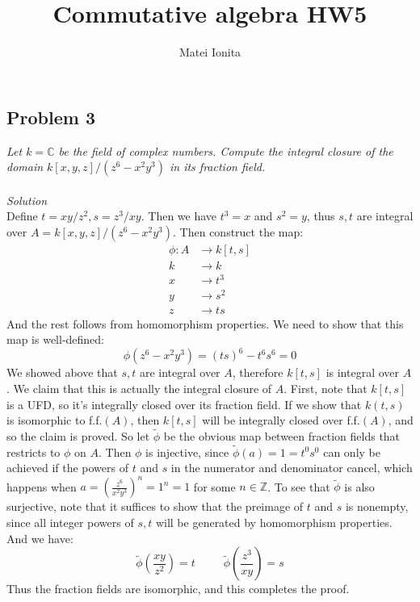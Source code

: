 \documentclass[12 pt]{article}
\title{Commutative algebra HW5}
\author{Matei Ionita}
\newcommand{\Z}{\mathbb{Z}}
\newcommand{\C}{\mathbb{C}}
\begin{document}
  \maketitle

\subsection*{Problem 3}
\emph{Let $k = \C$ be the field of complex numbers. Compute the integral closure of the domain $k[x, y, z]/(z^6 - x^2 y^3)$ in its fraction field.}
\\
\\
\emph{Solution}
\\
Define $t = xy/z^2, s = z^3/xy$. Then we have $t^3 = x$ and $s^2 = y$, thus $s,t$ are integral over $A = k[x, y, z]/(z^6 - x^2 y^3)$. Then construct the map:
\begin{align*}       \phi : A &\to k[t,s]     \\
 k &\to k \\
x &\to t^3 \\
y &\to s^2 \\
z &\to ts
\end{align*}
And the rest follows from homomorphism properties. We need to show that this map is well-defined:
\[   \phi(z^6 - x^2 y^3) = (ts)^6 - t^6s^6 = 0    \]
We showed above that $s,t$ are integral over $A$, therefore $k[t,s]$ is integral over $A$. We claim that this is actually the integral closure of $A$. First, note that $k[t,s]$ is a UFD, so it's integrally closed over its fraction field. If we show that $k(t,s)$ is isomorphic to f.f.$(A)$, then $k[t,s]$ will be integrally closed over f.f.$(A)$, and so the claim is proved. So let $\tilde \phi$ be the obvious map between fraction fields that restricts to $\phi$ on $A$. Then $\phi$ is injective, since $\tilde \phi (a) = 1 = t^0s^0$ can only be achieved if the powers of $t$ and $s$ in the numerator and denominator cancel, which happens when $a =\left( \frac{z^6}{x^2y^3}\right)^n = 1^n = 1$ for some $n\in \Z$. To see that $\tilde \phi$ is also surjective, note that it suffices to show that the preimage of $t$ and $s$ is nonempty, since all integer powers of $s,t$ will be generated by homomorphism properties. And we have:
\[   \tilde \phi \left(  \frac{xy}{z^2} \right) = t \;\;\;\;\;\;\;\;\;  \tilde \phi \left(  \frac{z^3}{xy} \right) = s  \]
Thus the fraction fields are isomorphic, and this completes the proof.
\end{document}
